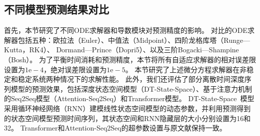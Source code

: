 \subsection{不同模型预测结果对比}
首先，本节研究了不同ODE求解器和导数模块对预测精度的影响。
对比的ODE求解器包括五种：欧拉法（Euler）、中值法（Midpoint）、四阶龙格库塔（Runge—Kutta，RK4）、 Dormand—Prince（Dopri5）\cite{NIPS2018_7892}、以及三阶Bogacki—Shampine（Bosh）\cite{bogacki19893}。
为了平衡时间消耗和预测精度，本节将所有自适应求解器的相对误差限设置为$1\mathrm{e}-4$，绝对误差限设置为$1\mathrm{e}-5$。
本节研究了上述微分方程求解器在非稳定和稳定系统两种情况下的求解性能。
此外，我们还评估了部分离散时间深度序列模型的预测效果，包括深度状态空间模型（DT-State-Space）、基于注意力机制的Seq2Seq模型（Attention-Seq2Seq）\cite{Member2019}和Transformer模型\cite{Wu2020}。
DT-State-Space~\cite{Rangapuram2018}模型采用循环神经网络（RNN）建模线性状态空间模型的动态参数，并利用预测得到的状态空间模型预测时间序列，其状态空间和RNN隐藏层的大小分别设置为16和32。
Transformer和Attention-Seq2Seq的超参数设置与原文献保持一致。

